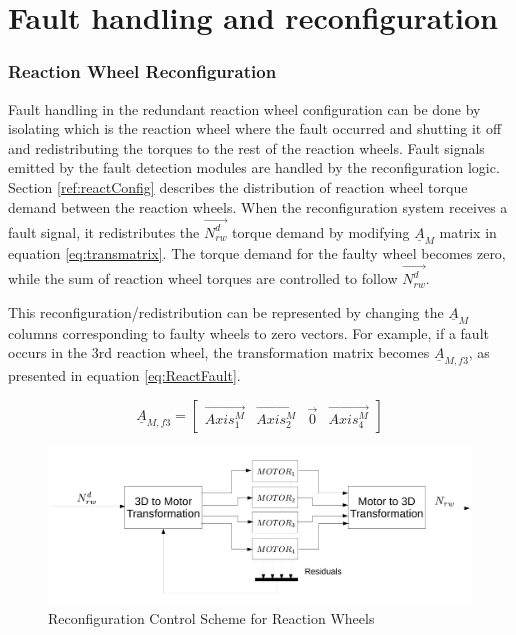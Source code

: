 \chapter{Fault handling and reconfiguration}
 \label{chap:faltHandling}
\subsection{Reaction Wheel Reconfiguration}
\label{sec:rwReconfig}
Fault handling in the redundant reaction wheel configuration can be done by isolating which is the reaction wheel where the fault occurred and shutting it off and redistributing the torques to the rest of the reaction wheels. Fault signals emitted by the fault detection modules are handled by the reconfiguration logic. Section \ref{ref:reactConfig} describes the distribution of reaction wheel torque demand between the reaction wheels. When the reconfiguration system receives a fault signal, it redistributes the $\vec{N_{rw}^d}$ torque demand by modifying $\underline{A}_M$ matrix in equation \ref{eq:transmatrix}. The torque demand for the faulty wheel becomes zero, while the sum of reaction wheel torques are controlled to follow $\vec{N_{rw}^d}$.

This reconfiguration/redistribution can be represented by changing the $\underline{A}_M$ columns corresponding to faulty wheels to zero vectors. For example, if a fault occurs in the 3rd reaction wheel, the transformation matrix becomes $\underline{A}_{M,f3}$, as presented in equation \ref{eq:ReactFault}.

\begin{equation}
	\label{eq:ReactFault}
	\underline{A}_{M,f3} = \begin{bmatrix}
		\vec{Axis^{M}_{1}}       & \vec{Axis^{M}_{2}}   & \vec{0}   & \vec{Axis^{M}_{4}} 
	\end{bmatrix} 
\end{equation}

\begin{figure}[H]
	\centering 
	\includegraphics[width=170mm]{figures/reconfig.pdf}	
	\caption{Reconfiguration Control Scheme for Reaction Wheels}
	\label{fig:reconfig}
\end{figure}

